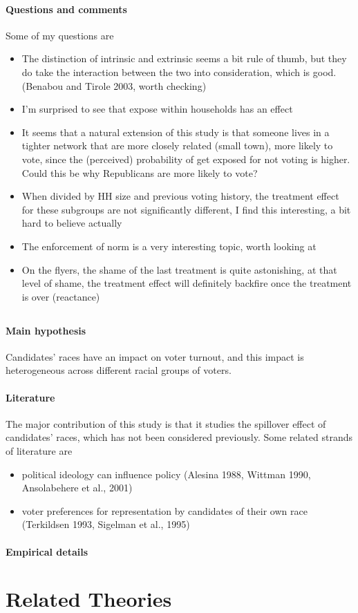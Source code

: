 \documentclass[twoside]{article}
\theoremstyle{definition}
\begin{document}
\paragraph*{Questions and comments} Some of my questions are 
\begin{itemize}
    \item The distinction of intrinsic and extrinsic seems a bit rule of thumb, but they do take the interaction between the two into consideration, which is good. (Benabou and Tirole 2003, worth checking)
    \item I'm surprised to see that expose within households has an effect
    \item It seems that a natural extension of this study is that someone lives in a tighter network that are more closely related (small town), more likely to vote, since the (perceived) probability of get exposed for not voting is higher. Could this be why Republicans are more likely to vote?
    \item When divided by HH size and previous voting history, the treatment effect for these subgroups are not significantly different, I find this interesting, a bit hard to believe actually
    \item The enforcement of norm is a very interesting topic, worth looking at
    \item On the flyers, the shame of the last treatment is quite astonishing, at that level of shame, the treatment effect will definitely backfire once the treatment is over (reactance)
\end{itemize}


\subsection*{\citet*{washington2006black}}

\paragraph*{Main hypothesis} Candidates' races have an impact on voter turnout, and this impact is heterogeneous across different racial groups of voters.

\paragraph*{Literature} The major contribution of this study is that it studies the spillover effect of candidates' races, which has not been considered previously. Some related strands of literature are 
\begin{itemize}
    \item political ideology can influence policy (Alesina 1988, Wittman 1990, Ansolabehere et al., 2001)
    \item voter preferences for representation by candidates of their own race (Terkildsen 1993, Sigelman et al., 1995)
\end{itemize}

\paragraph*{Empirical details}

\section{Related Theories}



\newpage


\end{document}

